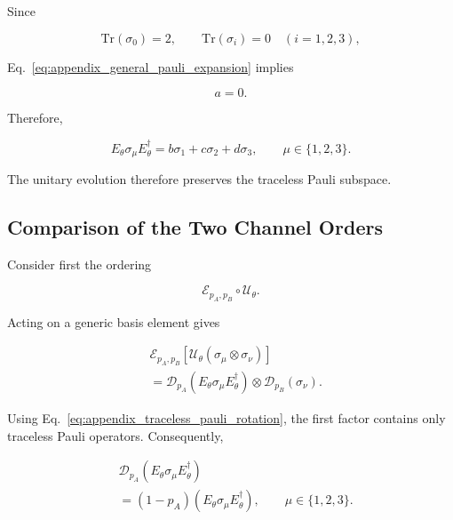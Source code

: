 Since

\[
\mathrm{Tr}(\sigma_0)=2,
\qquad
\mathrm{Tr}(\sigma_i)=0
\quad
(i=1,2,3),
\]

Eq.~\eqref{eq:appendix_general_pauli_expansion} implies

\[
a=0.
\]

Therefore,

\begin{equation}
E_{\theta}\sigma_{\mu}E_{\theta}^{\dagger}
=
b\sigma_1
+
c\sigma_2
+
d\sigma_3,
\qquad
\mu\in\{1,2,3\}.
\label{eq:appendix_traceless_pauli_rotation}
\end{equation}

\medskip

The unitary evolution therefore preserves the traceless Pauli subspace.


\subsection*{Comparison of the Two Channel Orders}

Consider first the ordering

\begin{equation}
\mathcal{E}_{p_A,p_B}
\circ
\mathcal{U}_{\theta}.
\end{equation}

Acting on a generic basis element gives

\begin{align}
&
\mathcal{E}_{p_A,p_B}
\left[
\mathcal{U}_{\theta}
\left(
\sigma_{\mu}\otimes\sigma_{\nu}
\right)
\right]
\nonumber
\\
&=
\mathcal{D}_{p_A}
\left(
E_{\theta}\sigma_{\mu}E_{\theta}^{\dagger}
\right)
\otimes
\mathcal{D}_{p_B}
\left(
\sigma_{\nu}
\right).
\label{eq:appendix_left_order}
\end{align}

Using Eq.~\eqref{eq:appendix_traceless_pauli_rotation}, the first factor contains only traceless Pauli operators. Consequently,

\begin{align}
&
\mathcal{D}_{p_A}
\left(
E_{\theta}\sigma_{\mu}E_{\theta}^{\dagger}
\right)
\nonumber
\\
&=
(1-p_A)
\left(
E_{\theta}\sigma_{\mu}E_{\theta}^{\dagger}
\right),
\qquad
\mu\in\{1,2,3\}.
\label{eq:appendix_left_scaling}
\end{align}

